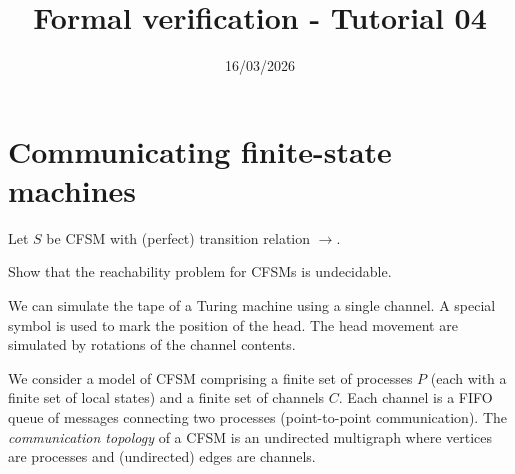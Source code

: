 

\title{Formal verification - Tutorial 04}
\date{16/03/2026}



\maketitle

\newcommand{\lossyto}{\Rightarrow}
\section*{Communicating finite-state machines}

Let $S$ be CFSM with (perfect) transition relation $\to$.

\begin{exercise}
	Show that the reachability problem for CFSMs is undecidable.
\end{exercise}

\begin{solution}
	We can simulate the tape of a Turing machine using a single channel.
	A special symbol is used to mark the position of the head.
	The head movement are simulated by rotations of the channel contents.
\end{solution}

We consider a model of CFSM comprising a finite set of processes $P$ (each with a finite set of local states)
and a finite set of channels $C$.
%
Each channel is a FIFO queue of messages connecting two processes (point-to-point communication).
%
The \emph{communication topology} of a CFSM is an undirected multigraph
where vertices are processes and (undirected) edges are channels.

